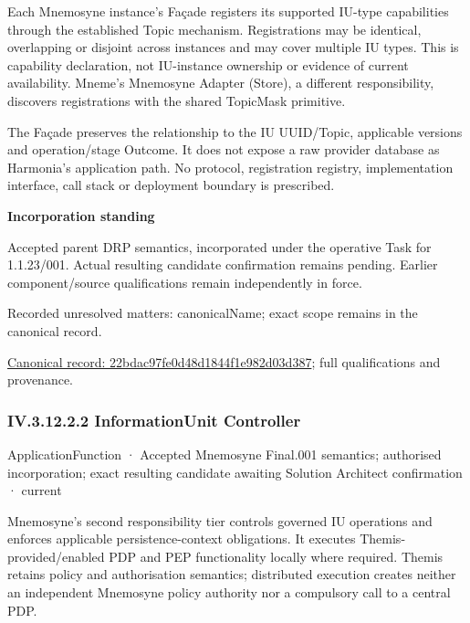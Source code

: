 Each Mnemosyne instance's Façade registers its supported IU-type capabilities through the established Topic mechanism. Registrations may be identical, overlapping or disjoint across instances and may cover multiple IU types. This is capability declaration, not IU-instance ownership or evidence of current availability. Mneme's Mnemosyne Adapter (Store), a different responsibility, discovers registrations with the shared TopicMask primitive.



The Façade preserves the relationship to the IU UUID/Topic, applicable versions and operation/stage Outcome. It does not expose a raw provider database as Harmonia's application path. No protocol, registration registry, implementation interface, call stack or deployment boundary is prescribed.



\par\medskip\textbf{Incorporation standing}\par


Accepted parent DRP semantics, incorporated under the operative Task for 1.1.23/001. Actual resulting candidate confirmation remains pending. Earlier component/source qualifications remain independently in force.


{\small Recorded unresolved matters: canonicalName; exact scope remains in the canonical record.}\par
{\footnotesize \href{../../../../../../../continuum/application/application-function/22bdac97fe0d48d1844f1e982d03d387.md}{Canonical record: 22bdac97fe0d48d1844f1e982d03d387}; full qualifications and provenance.}\par
\subsubsection*{IV.3.12.2.2 InformationUnit Controller}
\label{navigation:IV.3.12.2.2}

\label{element:ef864d509efa44a7a4160db2ca821163}
{\small ApplicationFunction · Accepted Mnemosyne Final.001 semantics; authorised incorporation; exact resulting candidate awaiting Solution Architect confirmation · current}\par

Mnemosyne's second responsibility tier controls governed IU operations and enforces applicable persistence-context obligations. It executes Themis-provided/enabled PDP and PEP functionality locally where required. Themis retains policy and authorisation semantics; distributed execution creates neither an independent Mnemosyne policy authority nor a compulsory call to a central PDP.



